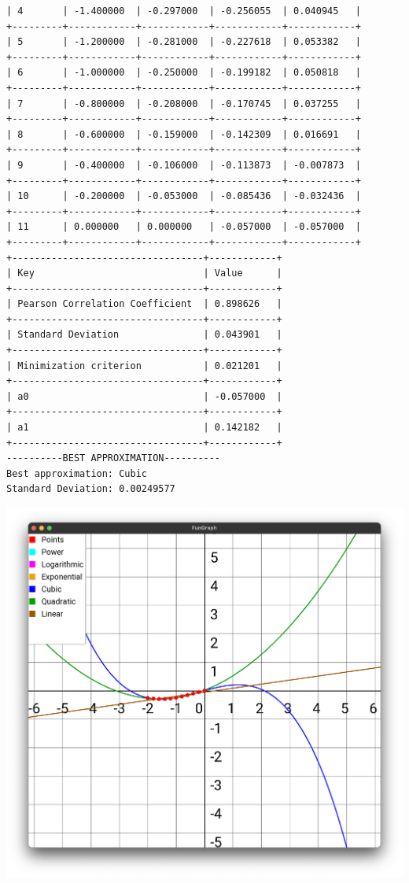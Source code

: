 \documentclass[12pt,one column]{article}
\begin{document}
\begin{verbatim}
| 4       | -1.400000  | -0.297000  | -0.256055  | 0.040945   | 
+---------+------------+------------+------------+------------+
| 5       | -1.200000  | -0.281000  | -0.227618  | 0.053382   | 
+---------+------------+------------+------------+------------+
| 6       | -1.000000  | -0.250000  | -0.199182  | 0.050818   | 
+---------+------------+------------+------------+------------+
| 7       | -0.800000  | -0.208000  | -0.170745  | 0.037255   | 
+---------+------------+------------+------------+------------+
| 8       | -0.600000  | -0.159000  | -0.142309  | 0.016691   | 
+---------+------------+------------+------------+------------+
| 9       | -0.400000  | -0.106000  | -0.113873  | -0.007873  | 
+---------+------------+------------+------------+------------+
| 10      | -0.200000  | -0.053000  | -0.085436  | -0.032436  | 
+---------+------------+------------+------------+------------+
| 11      | 0.000000   | 0.000000   | -0.057000  | -0.057000  | 
+---------+------------+------------+------------+------------+
+----------------------------------+------------+
| Key                              | Value      | 
+----------------------------------+------------+
| Pearson Correlation Coefficient  | 0.898626   | 
+----------------------------------+------------+
| Standard Deviation               | 0.043901   | 
+----------------------------------+------------+
| Minimization criterion           | 0.021201   | 
+----------------------------------+------------+
| a0                               | -0.057000  | 
+----------------------------------+------------+
| a1                               | 0.142182   | 
+----------------------------------+------------+
----------BEST APPROXIMATION----------
Best approximation: Cubic
Standard Deviation: 0.00249577
\end{verbatim}
\includegraphics[width = \textwidth]{img2.png}
\end{document}
